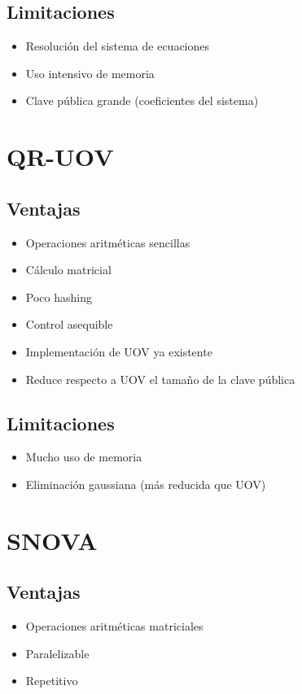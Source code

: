 \subsection*{Limitaciones}
\begin{itemize}
\item Resolución del sistema de ecuaciones
\item Uso intensivo de memoria
\item Clave pública grande (coeficientes del sistema)
\end{itemize}

\section{QR-UOV}

\subsection*{Ventajas}
\begin{itemize}
\item Operaciones aritméticas sencillas
\item Cálculo matricial
\item Poco hashing
\item Control asequible
\item Implementación de UOV ya existente
\item Reduce respecto a UOV el tamaño de la clave pública
\end{itemize}

\subsection*{Limitaciones}
\begin{itemize}
\item Mucho uso de memoria
\item Eliminación gaussiana (más reducida que UOV)
\end{itemize}

\section{SNOVA}

\subsection*{Ventajas}
\begin{itemize}
\item Operaciones aritméticas matriciales
\item Paralelizable
\item Repetitivo
\end{itemize}

